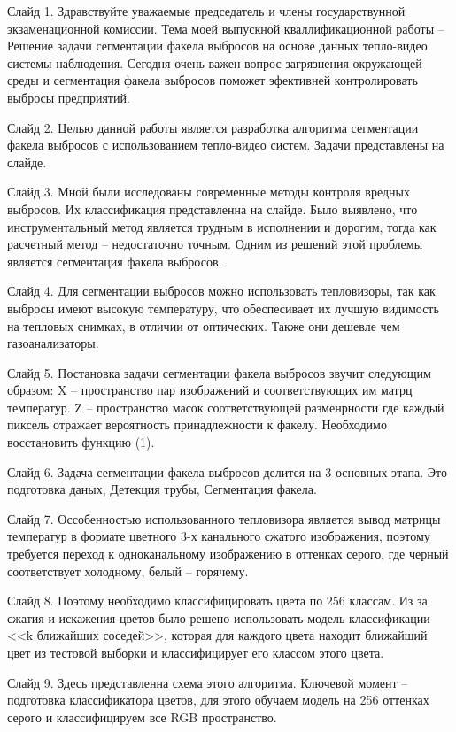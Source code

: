 \documentclass[14pt, a4paper]{extreport}
\begin{document}
	Слайд 1. Здравствуйте уважаемые председатель и члены государствунной экзаменационной комиссии. Тема моей выпускной кваллификационной работы -- Решение задачи сегментации
	факела выбросов на основе данных тепло-видео системы наблюдения. Сегодня очень важен вопрос загрязнения окружающей среды и сегментация факела выбросов поможет эфективней контролировать выбросы предприятий.
	
	Слайд 2. Целью данной работы является разработка алгоритма сегментации факела выбросов с использованием тепло-видео систем. Задачи представлены на слайде.
	
	Слайд 3. Мной были исследованы современные методы контроля вредных выбросов. Их классификация представленна на слайде. Было выявлено, что инструментальный метод является трудным в исполнении и дорогим, тогда как расчетный метод -- недостаточно точным. Одним из решений этой проблемы является сегментация факела выбросов.
	
	Слайд 4. Для сегментации выбросов можно использовать тепловизоры, так как выбросы имеют высокую температуру, что обеспесивает их лучшую видимость на тепловых снимках, в отличии от оптических. Также они дешевле чем газоанализаторы. 
	
	Слайд 5. Постановка задачи сегментации факела выбросов звучит следующим образом: X -- пространство пар изображений и соответствующих им матрц температур. Z -- пространство масок соответствующей разменрности где каждый пиксель отражает вероятность принадлежности к факелу. Необходимо восстановить функцию (1).
	
	Слайд 6. Задача сегментации факела выбросов делится на 3 основных этапа. Это подготовка даных, Детекция трубы, Сегментация факела.
	
	Слайд 7. Оссобенностью использованного тепловизора является вывод матрицы температур в формате цветного 3-х канального  сжатого изображения, поэтому требуется переход к одноканальному изображению в оттенках серого, где черный соответствует холодному, белый -- горячему.
	
	Слайд 8. Поэтому необходимо классифицировать цвета по 256 классам. Из за сжатия и искажения цветов было решено использовать модель классификации <<k ближайших соседей>>, которая для каждого цвета находит ближайший цвет из тестовой выборки и классифицирует его классом этого цвета.
	
	Слайд 9. Здесь представленна схема этого алгоритма. Ключевой момент -- подготовка классификатора цветов, для этого обучаем модель на 256 оттенках серого и классифицируем все RGB пространство. 
	
\end{document}
